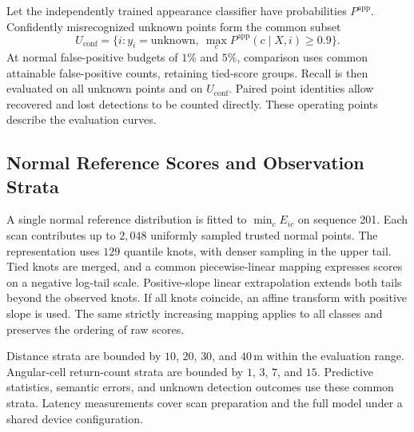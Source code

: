 \documentclass{article}
\begin{document}
Let the independently trained appearance classifier have probabilities $P^{\mathrm{app}}$. Confidently misrecognized unknown points form the common subset
\begin{equation}
 U_{\mathrm{conf}}=\{i:y_i=\mathrm{unknown},\ \max_c P^{\mathrm{app}}(c\mid X,i)\geq0.9\}.
\end{equation}
At normal false-positive budgets of $1\%$ and $5\%$, comparison uses common attainable false-positive counts, retaining tied-score groups. Recall is then evaluated on all unknown points and on $U_{\mathrm{conf}}$. Paired point identities allow recovered and lost detections to be counted directly. These operating points describe the evaluation curves.

\subsection{Normal Reference Scores and Observation Strata}
A single normal reference distribution is fitted to $\min_c E_{ic}$ on sequence 201. Each scan contributes up to $2{,}048$ uniformly sampled trusted normal points. The representation uses $129$ quantile knots, with denser sampling in the upper tail. Tied knots are merged, and a common piecewise-linear mapping expresses scores on a negative log-tail scale. Positive-slope linear extrapolation extends both tails beyond the observed knots. If all knots coincide, an affine transform with positive slope is used. The same strictly increasing mapping applies to all classes and preserves the ordering of raw scores.

Distance strata are bounded by $10$, $20$, $30$, and $40$\,m within the evaluation range. Angular-cell return-count strata are bounded by $1$, $3$, $7$, and $15$. Predictive statistics, semantic errors, and unknown detection outcomes use these common strata. Latency measurements cover scan preparation and the full model under a shared device configuration.
\end{document}
